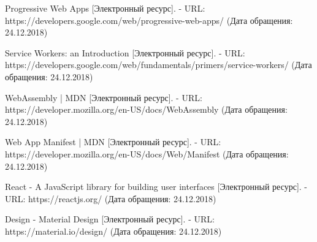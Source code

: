 \begingroup
\renewcommand{\section}[2]{\anonsection{Библиографический список}}
\begin{thebibliography}{00}

  Progressive Web Apps
  [Электронный ресурс]. - URL: https://developers.google.com/web/progressive-web-apps/
  (Дата обращения: 24.12.2018)

  Service Workers: an Introduction
  [Электронный ресурс]. - URL: https://developers.google.com/web/fundamentals/primers/service-workers/
  (Дата обращения: 24.12.2018)

  WebAssembly | MDN
  [Электронный ресурс]. - URL: https://developer.mozilla.org/en-US/docs/WebAssembly
  (Дата обращения: 24.12.2018)

  Web App Manifest | MDN
  [Электронный ресурс]. - URL: https://developer.mozilla.org/en-US/docs/Web/Manifest
  (Дата обращения: 24.12.2018)

  React - A JavaScript library for building user interfaces
  [Электронный ресурс]. - URL: https://reactjs.org/
  (Дата обращения: 24.12.2018)

  Design - Material Design
  [Электронный ресурс]. - URL: https://material.io/design/
  (Дата обращения: 24.12.2018)

\end{thebibliography}
\endgroup

\clearpage